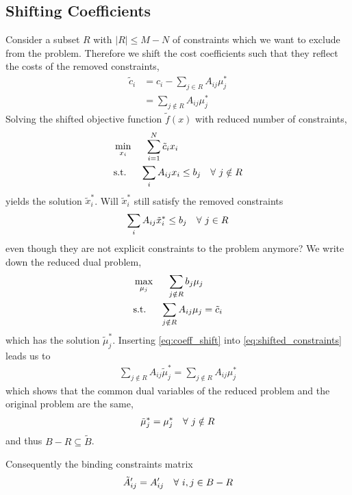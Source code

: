\documentclass[a4paper,10pt]{article}
\begin{document}
\subsection{Shifting Coefficients}
Consider a subset $R$ with $| R | \le M- N$ of constraints which we want to exclude from the problem. Therefore we shift the cost coefficients such that they reflect the costs of the removed constraints,
\begin{align}
 \tilde{c}_i &= c_i - \sum_{j \in R} A_{ij} \mu^*_j \\
 &= \sum_{j \notin R} A_{ij} \mu^*_j   \label{eq:coeff_shift}
\end{align}
Solving the shifted objective function $\tilde{f}(x)$ with reduced number of constraints,
\begin{align}
&\min_{x_i} \hspace{15pt} \sum_{i=1}^N \tilde{c}_i  x_i \\
&\text{s.t.}\hspace{15pt}  \sum_i A_{ij} x_i \le b_j \hspace{10pt} \forall \,\, j \notin R
\end{align}
yields the solution $\tilde{x}^*_i$. Will $\tilde{x}^*_i$ still satisfy the removed constraints 
\begin{align}
 \sum_i A_{ij} \tilde{x}^*_i \le b_j \hspace{10pt} \forall \,\, j \in R 
\end{align}
even though they are not explicit constraints to the problem anymore? We write down the reduced dual problem,
\begin{align}
& \max_{\mu_j} \hspace{15pt} \sum_{j \notin R} b_j \mu_j  \\
& \text{s.t.}\hspace{15pt} \sum_{j \notin R} A_{ij} \mu_j = \tilde{c}_i \label{eq:shifted_constraints}
\end{align}
which has the solution $\tilde{\mu}^*_j $. Inserting \cref{eq:coeff_shift} into \cref{eq:shifted_constraints} leads us to 
\begin{align}
 \sum_{j \notin R} A_{ij} \tilde{\mu}^*_j = \sum_{j \notin R} A_{ij} \mu^*_j 
\end{align}
which shows that the common dual variables of the reduced problem and the original problem are the same,
\begin{align}
 \tilde{\mu}^*_j =  \mu^*_j \hspace{10pt} \forall \,\, j \notin R
\end{align}
and thus $B - R \subseteq \tilde{B}$. 


Consequently the binding constraints matrix 
\begin{align}
 \tilde{A}^{\prime}_{ij} =  A^{\prime}_{ij} \hspace{10pt} \forall \,\, i, j \in B - R
\end{align}
\end{document}
